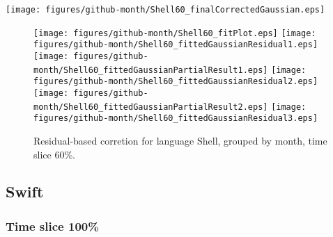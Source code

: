 \begin{center}
{\texttt{[image: figures/github-month/Shell60\_finalCorrectedGaussian.eps]}}
\end{center}

\FloatBarrier

\begin{figure}[t]
\centering
{}
{\texttt{[image: figures/github-month/Shell60\_fitPlot.eps]}}
{\texttt{[image: figures/github-month/Shell60\_fittedGaussianResidual1.eps]}}
{\texttt{[image: figures/github-month/Shell60\_fittedGaussianPartialResult1.eps]}}
{\texttt{[image: figures/github-month/Shell60\_fittedGaussianResidual2.eps]}}
{\texttt{[image: figures/github-month/Shell60\_fittedGaussianPartialResult2.eps]}}
{\texttt{[image: figures/github-month/Shell60\_fittedGaussianResidual3.eps]}}
\caption{Residual-based corretion for language Shell, grouped by month, time slice 60\%.}
\end{figure}


\FloatBarrier


\subsection{Swift}

\subsubsection{Time slice 100\%}

